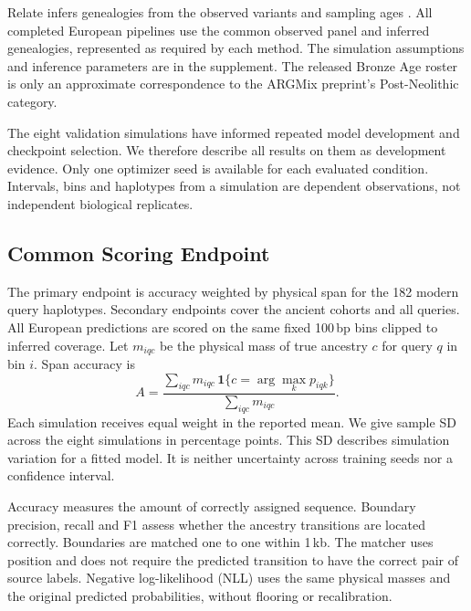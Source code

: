 \documentclass[letterpaper]{article}
\begin{document}
Relate infers genealogies from the observed variants and sampling ages \citep{relate2019}. All completed European pipelines use the common observed panel and inferred genealogies, represented as required by each method. The simulation assumptions and inference parameters are in the supplement. The released Bronze Age roster is only an approximate correspondence to the ARGMix preprint's Post-Neolithic category.

The eight validation simulations have informed repeated model development and checkpoint selection. We therefore describe all results on them as development evidence. Only one optimizer seed is available for each evaluated condition. Intervals, bins and haplotypes from a simulation are dependent observations, not independent biological replicates.

\subsection{Common Scoring Endpoint}
The primary endpoint is accuracy weighted by physical span for the 182 modern query haplotypes. Secondary endpoints cover the ancient cohorts and all queries. All European predictions are scored on the same fixed 100\,bp bins clipped to inferred coverage. Let $m_{iqc}$ be the physical mass of true ancestry $c$ for query $q$ in bin $i$. Span accuracy is
\begin{equation}
A=
\frac{\sum_{iqc}m_{iqc}\,
\mathbf{1}\{c=\arg\max_k p_{iqk}\}}
{\sum_{iqc}m_{iqc}}.
\end{equation}
Each simulation receives equal weight in the reported mean. We give sample SD across the eight simulations in percentage points. This SD describes simulation variation for a fitted model. It is neither uncertainty across training seeds nor a confidence interval.

Accuracy measures the amount of correctly assigned sequence. Boundary precision, recall and F1 assess whether the ancestry transitions are located correctly. Boundaries are matched one to one within 1\,kb. The matcher uses position and does not require the predicted transition to have the correct pair of source labels. Negative log-likelihood (NLL) uses the same physical masses and the original predicted probabilities, without flooring or recalibration.
\end{document}
